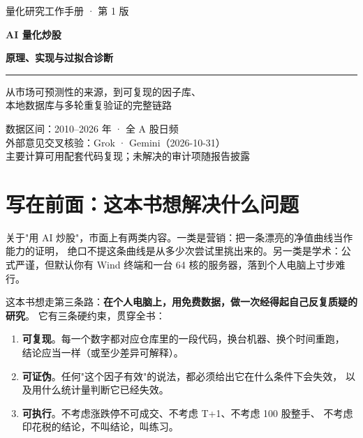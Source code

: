 \documentclass[UTF8,11pt,a4paper,openany,fontset=windows]{ctexbook}
\begin{document}
\frontmatter
\thispagestyle{empty}
\begin{center}
\vspace*{3.2cm}
{\sffamily\color{accent}\fontsize{13}{16}\selectfont 量化研究工作手册 · 第 1 版}

\vspace{1.4cm}
{\sffamily\bfseries\color{ink}\fontsize{34}{42}\selectfont AI 量化炒股}

\vspace{6pt}
{\sffamily\bfseries\color{ink}\fontsize{22}{30}\selectfont 原理、实现与过拟合诊断}

\vspace{1.6cm}
{\color{accent}\rule{0.62\textwidth}{1.2pt}}

\vspace{0.9cm}
{\large\color{ink!85}
从市场可预测性的来源，到可复现的因子库、\\[4pt]
本地数据库与多轮重复验证的完整链路}

\vfill
{\small\color{gray}
数据区间：2010--2026 年 · 全 A 股日频\\
外部意见交叉核验：Grok · Gemini（2026-10-31）\\
主要计算可用配套代码复现；未解决的审计项随报告披露}
\vspace{2.2cm}
\end{center}
\clearpage

\chapter*{写在前面：这本书想解决什么问题}

关于"用 AI 炒股"，市面上有两类内容。一类是营销：把一条漂亮的净值曲线当作能力的证明，
绝口不提这条曲线是从多少次尝试里挑出来的。另一类是学术：公式严谨，但默认你有
Wind 终端和一台 64 核的服务器，落到个人电脑上寸步难行。

这本书想走第三条路：\textbf{在个人电脑上，用免费数据，做一次经得起自己反复质疑的研究}。
它有三条硬约束，贯穿全书：

\begin{enumerate}
  \item \textbf{可复现}。每一个数字都对应仓库里的一段代码，换台机器、换个时间重跑，
        结论应当一样（或至少差异可解释）。
  \item \textbf{可证伪}。任何"这个因子有效"的说法，都必须给出它在什么条件下会失效，
        以及用什么统计量判断它已经失效。
  \item \textbf{可执行}。不考虑涨跌停不可成交、不考虑 T+1、不考虑 100 股整手、
        不考虑印花税的结论，不叫结论，叫练习。
\end{enumerate}
\end{document}
